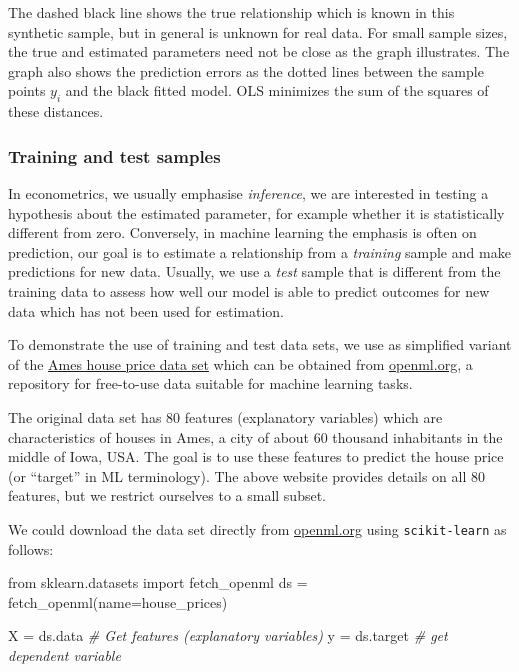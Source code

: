 \documentclass{scrartcl}
\newenvironment{Shaded}{}{}
\newcommand{\StringTok}[1]{\textcolor[rgb]{0.25,0.44,0.63}{{#1}}}
\newcommand{\CommentTok}[1]{\textcolor[rgb]{0.38,0.63,0.69}{\textit{{#1}}}}
\newcommand{\NormalTok}[1]{{#1}}
\newcommand{\ImportTok}[1]{{#1}}
\newcommand{\OperatorTok}[1]{\textcolor[rgb]{0.40,0.40,0.40}{{#1}}}
\begin{document}
    \begin{center}
    \end{center}
    
    The dashed black line shows the true relationship which is known in this
synthetic sample, but in general is unknown for real data. For small
sample sizes, the true and estimated parameters need not be close as the
graph illustrates. The graph also shows the prediction errors as the
dotted lines between the sample points \(y_i\) and the black fitted
model. OLS minimizes the sum of the squares of these distances.

    \hypertarget{training-and-test-samples}{%
\subsubsection{Training and test
samples}\label{training-and-test-samples}}

In econometrics, we usually emphasise \emph{inference}, \ie we are
interested in testing a hypothesis about the estimated parameter, for
example whether it is statistically different from zero. Conversely, in
machine learning the emphasis is often on prediction, \ie our goal is
to estimate a relationship from a \emph{training} sample and make
predictions for new data. Usually, we use a \emph{test} sample that is
different from the training data to assess how well our model is able to
predict outcomes for new data which has not been used for estimation.

    To demonstrate the use of training and test data sets, we use as
simplified variant of the \href{https://www.openml.org/d/42165}{Ames
house price data set} which can be obtained from
\href{https://www.openml.org}{openml.org}, a repository for free-to-use
data suitable for machine learning tasks.

The original data set has 80 features (explanatory variables) which are
characteristics of houses in Ames, a city of about 60 thousand
inhabitants in the middle of Iowa, USA. The goal is to use these
features to predict the house price (or ``target'' in ML terminology).
The above website provides details on all 80 features, but we restrict
ourselves to a small subset.

We could download the data set directly from
\href{https://www.openml.org}{openml.org} using \texttt{scikit-learn} as
follows:

\begin{Shaded}
\begin{Highlighting}[]
    \ImportTok{from}\NormalTok{ sklearn.datasets }\ImportTok{import}\NormalTok{ fetch\_openml}
\NormalTok{    ds }\OperatorTok{=}\NormalTok{ fetch\_openml(name}\OperatorTok{=}\StringTok{\textquotesingle{}house\_prices\textquotesingle{}}\NormalTok{)}

\NormalTok{    X }\OperatorTok{=}\NormalTok{ ds.data         }\CommentTok{\# Get features (explanatory variables)}
\NormalTok{    y }\OperatorTok{=}\NormalTok{ ds.target       }\CommentTok{\# get dependent variable}
\end{Highlighting}
\end{Shaded}
\end{document}
